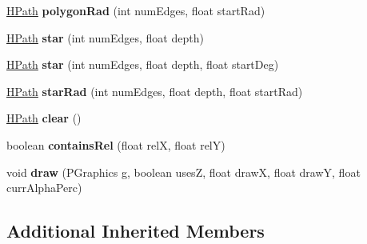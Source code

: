 \begin{DoxyCompactItemize}
\item 
\hypertarget{classhype_1_1drawable_1_1_h_path_a2e50e660109761776241d9c41e8fb132}{\hyperlink{classhype_1_1drawable_1_1_h_path}{H\-Path} {\bfseries polygon\-Rad} (int num\-Edges, float start\-Rad)}\label{classhype_1_1drawable_1_1_h_path_a2e50e660109761776241d9c41e8fb132}

\item 
\hypertarget{classhype_1_1drawable_1_1_h_path_a80d11cfd16ae84a07aa52b7d59e301ce}{\hyperlink{classhype_1_1drawable_1_1_h_path}{H\-Path} {\bfseries star} (int num\-Edges, float depth)}\label{classhype_1_1drawable_1_1_h_path_a80d11cfd16ae84a07aa52b7d59e301ce}

\item 
\hypertarget{classhype_1_1drawable_1_1_h_path_a7331d86a61b558eb840ac66da5a23f4e}{\hyperlink{classhype_1_1drawable_1_1_h_path}{H\-Path} {\bfseries star} (int num\-Edges, float depth, float start\-Deg)}\label{classhype_1_1drawable_1_1_h_path_a7331d86a61b558eb840ac66da5a23f4e}

\item 
\hypertarget{classhype_1_1drawable_1_1_h_path_acaae9c01f4b330740a387f6e55b82b7b}{\hyperlink{classhype_1_1drawable_1_1_h_path}{H\-Path} {\bfseries star\-Rad} (int num\-Edges, float depth, float start\-Rad)}\label{classhype_1_1drawable_1_1_h_path_acaae9c01f4b330740a387f6e55b82b7b}

\item 
\hypertarget{classhype_1_1drawable_1_1_h_path_aae95fc174db2c006e5cb7f2df99b5232}{\hyperlink{classhype_1_1drawable_1_1_h_path}{H\-Path} {\bfseries clear} ()}\label{classhype_1_1drawable_1_1_h_path_aae95fc174db2c006e5cb7f2df99b5232}

\item 
\hypertarget{classhype_1_1drawable_1_1_h_path_a2f3932e890ba712db9935def871ffc5d}{boolean {\bfseries contains\-Rel} (float rel\-X, float rel\-Y)}\label{classhype_1_1drawable_1_1_h_path_a2f3932e890ba712db9935def871ffc5d}

\item 
\hypertarget{classhype_1_1drawable_1_1_h_path_af4d2d92b1c30aa6f9f7e91ab162364c0}{void {\bfseries draw} (P\-Graphics g, boolean uses\-Z, float draw\-X, float draw\-Y, float curr\-Alpha\-Perc)}\label{classhype_1_1drawable_1_1_h_path_af4d2d92b1c30aa6f9f7e91ab162364c0}

\end{DoxyCompactItemize}
\subsection*{Additional Inherited Members}


